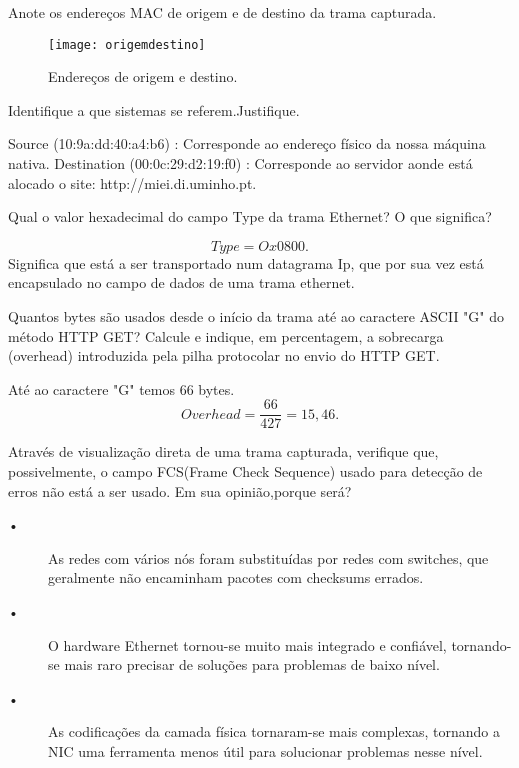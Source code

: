 \documentclass{exam}
\begin{document}
\begin{questions}

\question Anote os endereços MAC de origem e de destino da trama capturada.
\begin{solution}
\begin{figure}[H]
\centering\texttt{[image: origemdestino]} 
\caption{\label{fig:controller}Endereços de origem e destino.}
\end{figure} 
\end{solution}

\question Identifique a que sistemas se referem.Justifique.
\begin{solution}
Source (10:9a:dd:40:a4:b6) : Corresponde ao endereço físico da nossa máquina nativa.
Destination (00:0c:29:d2:19:f0) : Corresponde ao servidor aonde está alocado o site: http://miei.di.uminho.pt.
 \end{solution}

\question Qual o valor hexadecimal do campo Type da trama Ethernet? O que significa?
\begin{solution}
 \begin{equation}
Type= Ox0800. 
\end{equation}
Significa que está a ser transportado num datagrama Ip, que por sua vez está encapsulado no campo de dados de uma trama ethernet.
\end{solution}

\question Quantos bytes são usados desde o início da trama até ao caractere ASCII "G" do método HTTP GET?
Calcule e indique, em percentagem, a sobrecarga (overhead) introduzida pela pilha protocolar no envio do HTTP GET.
\begin{solution}
Até ao caractere "G" temos 66 bytes.
 \begin{equation}
Overhead= \frac{66}{427} = 15,46.
\end{equation}
\end{solution}

\question Através de visualização direta de uma trama capturada, verifique que, possivelmente, o campo FCS(Frame Check Sequence) usado para detecção de erros não está a ser usado. Em sua opinião,porque será?
\begin{solution}
\begin{description}
	\item[•] As redes com vários nós foram substituídas por redes com switches, que geralmente não encaminham pacotes com checksums errados. 
	\item[•] O hardware Ethernet tornou-se muito mais integrado e confiável, tornando-se mais raro precisar de soluções para problemas de baixo nível.  
	\item[•] As codificações da camada física tornaram-se mais complexas, tornando a NIC uma ferramenta menos útil para solucionar problemas nesse nível.
\end{description}
\end{solution}


\end{questions}
\end{document}
